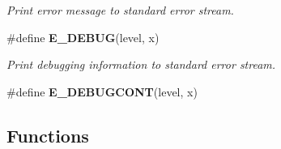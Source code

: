 \begin{CompactItemize}
\begin{CompactList}\small\item\em Print error message to standard error stream. \item\end{CompactList}\item 
\#define {\bf E\_\-DEBUG}(level, x)
\begin{CompactList}\small\item\em Print debugging information to standard error stream. \item\end{CompactList}\item 
\#define \textbf{E\_\-DEBUGCONT}(level, x)\label{err_8h_7e8c4b068434a0424751fc2d2c457807}

\end{CompactItemize}
\subsection*{Functions}
